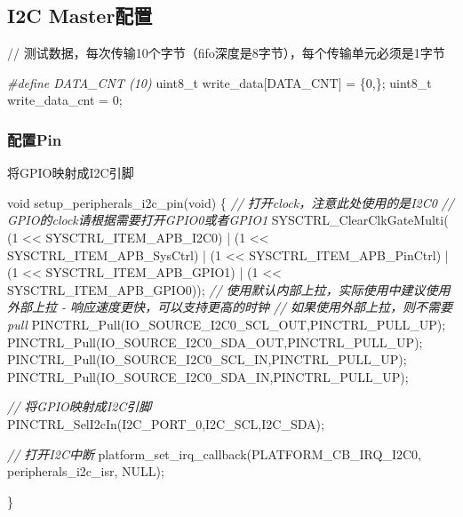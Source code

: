 \documentclass[
  12pt,
]{book}
\newenvironment{Shaded}{\begin{snugshade}}{\end{snugshade}}
\newcommand{\CommentTok}[1]{\textcolor[rgb]{0.56,0.35,0.01}{\textit{#1}}}
\newcommand{\DataTypeTok}[1]{\textcolor[rgb]{0.13,0.29,0.53}{#1}}
\newcommand{\DecValTok}[1]{\textcolor[rgb]{0.00,0.00,0.81}{#1}}
\newcommand{\NormalTok}[1]{#1}
\newcommand{\PreprocessorTok}[1]{\textcolor[rgb]{0.56,0.35,0.01}{\textit{#1}}}
\begin{document}
\hypertarget{i2c-masterux914dux7f6e-1}{%
\subsection{I2C Master配置}\label{i2c-masterux914dux7f6e-1}}

// 测试数据，每次传输10个字节（fifo深度是8字节），每个传输单元必须是1字节

\begin{Shaded}
\begin{Highlighting}[]
\PreprocessorTok{#define DATA_CNT (10)}
\DataTypeTok{uint8_t}\NormalTok{ write_data[DATA_CNT] = \{}\DecValTok{0}\NormalTok{,\};}
\DataTypeTok{uint8_t}\NormalTok{ write_data_cnt = }\DecValTok{0}\NormalTok{;}
\end{Highlighting}
\end{Shaded}

\hypertarget{ux914dux7f6epin-2}{%
\subsubsection{配置Pin}\label{ux914dux7f6epin-2}}

将GPIO映射成I2C引脚

\begin{Shaded}
\begin{Highlighting}[]
\DataTypeTok{void}\NormalTok{ setup_peripherals_i2c_pin(}\DataTypeTok{void}\NormalTok{)}
\NormalTok{\{}
  \CommentTok{// 打开clock，注意此处使用的是I2C0}
  \CommentTok{// GPIO的clock请根据需要打开GPIO0或者GPIO1}
\NormalTok{  SYSCTRL_ClearClkGateMulti(    (}\DecValTok{1}\NormalTok{ << SYSCTRL_ITEM_APB_I2C0)}
\NormalTok{                                | (}\DecValTok{1}\NormalTok{ << SYSCTRL_ITEM_APB_SysCtrl)}
\NormalTok{                                | (}\DecValTok{1}\NormalTok{ << SYSCTRL_ITEM_APB_PinCtrl)}
\NormalTok{                                | (}\DecValTok{1}\NormalTok{ << SYSCTRL_ITEM_APB_GPIO1)}
\NormalTok{                                | (}\DecValTok{1}\NormalTok{ << SYSCTRL_ITEM_APB_GPIO0));}
  \CommentTok{// 使用默认内部上拉，实际使用中建议使用外部上拉 - 响应速度更快，可以支持更高的时钟}
  \CommentTok{// 如果使用外部上拉，则不需要pull}
\NormalTok{  PINCTRL_Pull(IO_SOURCE_I2C0_SCL_OUT,PINCTRL_PULL_UP);}
\NormalTok{  PINCTRL_Pull(IO_SOURCE_I2C0_SDA_OUT,PINCTRL_PULL_UP);}
\NormalTok{  PINCTRL_Pull(IO_SOURCE_I2C0_SCL_IN,PINCTRL_PULL_UP);}
\NormalTok{  PINCTRL_Pull(IO_SOURCE_I2C0_SDA_IN,PINCTRL_PULL_UP);}
  
  \CommentTok{// 将GPIO映射成I2C引脚}
\NormalTok{  PINCTRL_SelI2cIn(I2C_PORT_0,I2C_SCL,I2C_SDA);}
  
  \CommentTok{// 打开I2C中断}
\NormalTok{  platform_set_irq_callback(PLATFORM_CB_IRQ_I2C0, peripherals_i2c_isr, NULL);}
  
\NormalTok{\}}
\end{Highlighting}
\end{Shaded}
\end{document}
